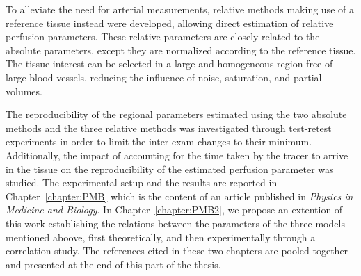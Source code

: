 To alleviate the need for arterial measurements, relative methods making use of a reference tissue instead were developed, allowing direct estimation of relative perfusion parameters.
These relative parameters are closely related to the absolute parameters, except they are normalized according to the reference tissue.
The tissue interest can be selected in a large and homogeneous region free of large blood vessels, reducing the influence of noise, saturation, and partial volumes.

The reproducibility of the regional parameters estimated using the two absolute methods and the three relative methods was investigated through test-retest experiments in order to limit the inter-exam changes to their minimum.
Additionally, the impact of accounting for the time taken by the tracer to arrive in the tissue on the reproducibility of the estimated perfusion parameter was studied. 
The experimental setup and the results are reported in Chapter~\ref{chapter:PMB} which is the content of an article published in {\em Physics in Medicine and Biology}.
In Chapter~\ref{chapter:PMB2}, we propose an extention of this work establishing the relations between the parameters of the three models mentioned aboove, first theoretically, and then experimentally through a correlation study.
The references cited in these two chapters are pooled together and presented at the end of this part of the thesis.